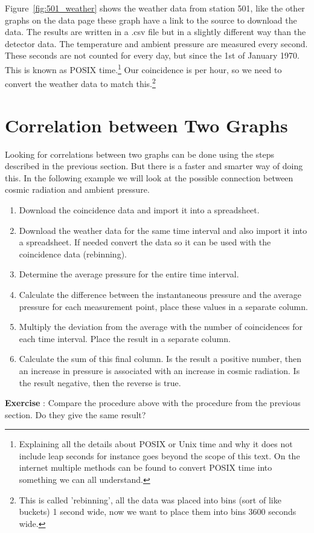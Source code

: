 Figure~\ref{fig:501_weather} shows the weather data from station 501, like the other graphs on the data page these graph have a link to the source to download the data. The results are written in a .csv file but in a slightly different way than the detector data. The temperature and ambient pressure are measured every second. These seconds are not counted for every day, but since the 1st of January 1970. This is known as POSIX time.\footnote{Explaining all the details about POSIX or Unix time and why it does not include leap seconds for instance goes beyond the scope of this text. On the internet multiple methods can be found to convert POSIX time into something we can all understand.} Our coincidence is per hour, so we need to convert the weather data to match this.\footnote{This is called 'rebinning', all the data was placed into bins (sort of like buckets) 1 second wide, now we want to place them into bins 3600 seconds wide.}

\section{Correlation between Two Graphs}
Looking for correlations between two graphs can be done using the steps described in the previous section. But there is a faster and smarter way of doing this. In the following example we will look at the possible connection between cosmic radiation and ambient pressure.

\begin{enumerate}[1]
\item Download the coincidence data and import it into a spreadsheet.
\item Download the weather data for the same time interval and also import it into a spreadsheet. If needed convert the data so it can be used with the coincidence data (rebinning).
\item Determine the average pressure for the entire time interval.
\item Calculate the difference between the instantaneous pressure and the average pressure for each measurement point, place these values in a separate column.
\item Multiply the deviation from the average with the number of coincidences for each time interval. Place the result in a separate column.
\item Calculate the sum of this final column. Is the result a positive number, then an increase in pressure is associated with an increase in cosmic radiation. Is the result negative, then the reverse is true. 
\end{enumerate}

\begin{shaded}
\textbf{Exercise \theExercise {}} : Compare the procedure above with the procedure from the previous section. Do they give the same result?\end{shaded}


